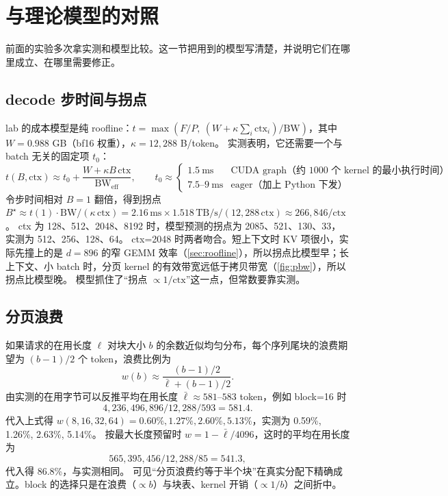 \documentclass[11pt,a4paper]{ctexart}
\begin{document}
\section{与理论模型的对照}\label{sec:theory-srv}
前面的实验多次拿实测和模型比较。这一节把用到的模型写清楚，并说明它们在哪里成立、在哪里需要修正。

\subsection{decode 步时间与拐点}
lab 的成本模型是纯 roofline：$t = \max(F/P,\ (W + \kappa\sum_i \text{ctx}_i)/\text{BW})$，其中 $W=0.988$ GB（bf16 权重），$\kappa=12{,}288$ B/token。
实测表明，它还需要一个与 batch 无关的固定项 $t_0$：
\begin{equation}
t(B,\text{ctx}) \approx t_0 + \frac{W + \kappa B\,\text{ctx}}{\text{BW}_{\text{eff}}},\qquad
t_0 \approx \begin{cases} 1.5\ \text{ms} & \text{CUDA graph（约 1000 个 kernel 的最小执行时间）}\\ 7.5\text{--}9\ \text{ms} & \text{eager（加上 Python 下发）}\end{cases}
\end{equation}
令步时间相对 $B=1$ 翻倍，得到拐点 $B^\star \approx t(1)\cdot\text{BW}/(\kappa\,\text{ctx}) = 2.16\,\text{ms}\times1.518\,\text{TB/s}/(12{,}288\,\text{ctx}) \approx 266{,}846/\text{ctx}$。
ctx 为 128、512、2048、8192 时，模型预测的拐点为 2085、521、130、33，实测为 512、256、128、64。
ctx=2048 时两者吻合。短上下文时 KV 项很小，实际先撞上的是 $d=896$ 的窄 GEMM 效率（\cref{sec:roofline}），所以拐点比模型早；长上下文、小 batch 时，分页 kernel 的有效带宽远低于拷贝带宽（\cref{fig:pbw}），所以拐点比模型晚。
模型抓住了“拐点 $\propto 1/\text{ctx}$”这一点，但常数要靠实测。

\subsection{分页浪费}
如果请求的在用长度 $\ell$ 对块大小 $b$ 的余数近似均匀分布，每个序列尾块的浪费期望为 $(b-1)/2$ 个 token，浪费比例为
\begin{equation}
w(b) \approx \frac{(b-1)/2}{\bar\ell + (b-1)/2}.
\end{equation}
由实测的在用字节可以反推平均在用长度 $\bar\ell \approx 581$--$583$ token，例如 block=16 时
\[ 4{,}236{,}496{,}896/12{,}288/593 = 581.4. \]
代入上式得 $w(8,16,32,64) = 0.60\%, 1.27\%, 2.60\%, 5.13\%$，实测为 0.59\%, 1.26\%, 2.63\%, 5.14\%。
按最大长度预留时 $w = 1-\bar\ell/4096$，这时的平均在用长度为
\[ 565{,}395{,}456/12{,}288/85=541.3, \]
代入得 86.8\%，与实测相同。
可见“分页浪费约等于半个块”在真实分配下精确成立。block 的选择只是在浪费（$\propto b$）与块表、kernel 开销（$\propto 1/b$）之间折中。
\end{document}
